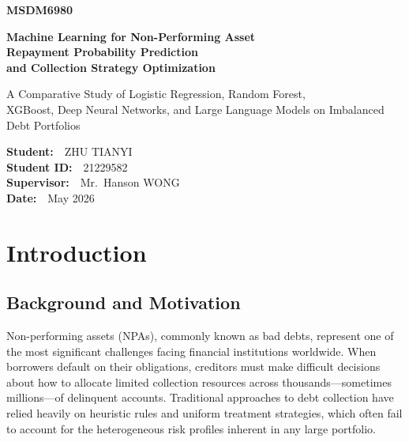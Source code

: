 \documentclass[12pt, a4paper]{article}
\begin{document}
\begin{titlepage}
    \centering
    \vspace*{2cm}

    {\Huge \textbf{MSDM6980}\par}
    \vspace{1cm}
    {\Large \textbf{Machine Learning for Non-Performing Asset\\[0.3em]Repayment Probability Prediction\\[0.3em]and Collection Strategy Optimization}\par}

    \vspace{2.5cm}

    {\large A Comparative Study of Logistic Regression, Random Forest,\\[0.2em]XGBoost, Deep Neural Networks, and Large Language Models on Imbalanced Debt Portfolios\par}

    \vfill

    \begin{flushright}
        \textbf{Student:}~~ZHU TIANYI\\[0.3em]
        \textbf{Student ID:}~~21229582\\[0.8em]
        \textbf{Supervisor:}~~Mr.\ Hanson WONG\\[0.8em]
        \textbf{Date:}~~May 2026
    \end{flushright}

    \vspace{1cm}
\end{titlepage}


\section{Introduction}\label{sec:intro}

\subsection{Background and Motivation}

Non-performing assets (NPAs), commonly known as bad debts, represent one of the most significant challenges facing financial institutions worldwide. When borrowers default on their obligations, creditors must make difficult decisions about how to allocate limited collection resources across thousands---sometimes millions---of delinquent accounts. Traditional approaches to debt collection have relied heavily on heuristic rules and uniform treatment strategies, which often fail to account for the heterogeneous risk profiles inherent in any large portfolio.
\end{document}
